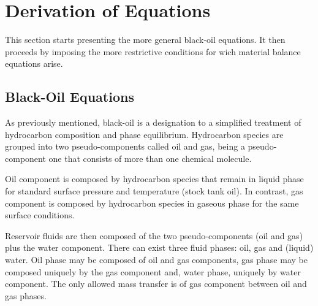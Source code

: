 \documentclass[authoryear,preprint,review,12pt]{elsarticle}
\begin{document}
%
%
%
%
%

\section{Derivation of Equations}

This section starts presenting the more general black-oil equations. It then proceeds by imposing the more restrictive conditions for wich material balance equations arise.

\subsection{Black-Oil Equations}

As previously mentioned, black-oil is a designation to a simplified treatment of hydrocarbon composition and phase equilibrium. Hydrocarbon species are grouped into two pseudo-components called oil and gas, being a pseudo-component one that consists of more than one chemical molecule.

Oil component is composed by hydrocarbon species that remain in liquid phase for standard surface pressure and temperature (stock tank oil). In contrast, gas component is composed by hydrocarbon species in gaseous phase for the same surface conditions.

Reservoir fluids are then composed of the two pseudo-components (oil and gas) plus the water component. There can exist three fluid phases: oil, gas and (liquid) water. Oil phase may be composed of oil and gas components, gas phase may be composed uniquely by the gas component and, water phase, uniquely by water component. The only allowed mass transfer is of gas component between oil and gas phases.
\end{document}
